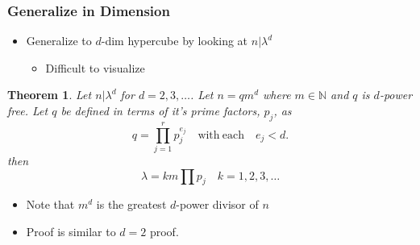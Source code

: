 \documentclass{beamer}
\theoremstyle{mydef}
\newtheorem{thm}{Theorem}[section]
\begin{document}
\frame
{
 \frametitle{Generalize in Dimension}
  \begin{itemize}
  \item Generalize to $d$-dim hypercube by looking at $n \vert \lambda^d$
  \begin{itemize}
  \item Difficult to visualize
      \end{itemize}
   \end{itemize}
  \begin{thm}
Let $n\vert \lambda^d$ for $d=2, 3, \ldots$. Let $n = qm^d$ where $m \in \mathbb{N}$ and $q$ is $d$-power 
free. Let $q$ be defined in terms of it's prime factors, $p_j$, as
\[
	q = \prod\limits_{j=1}^{r} p_j^{e_j}\quad \text{with}\ \text{each}\quad e_j < d.
\]
then
\[
	\lambda = k m \prod p_j \quad k = 1, 2, 3, \ldots
\]
\end{thm}
\begin{itemize}
\item Note that $m^d$ is the greatest $d$-power divisor of $n$
\item Proof is similar to $d=2$ proof.
\end{itemize}
}
\end{document}
